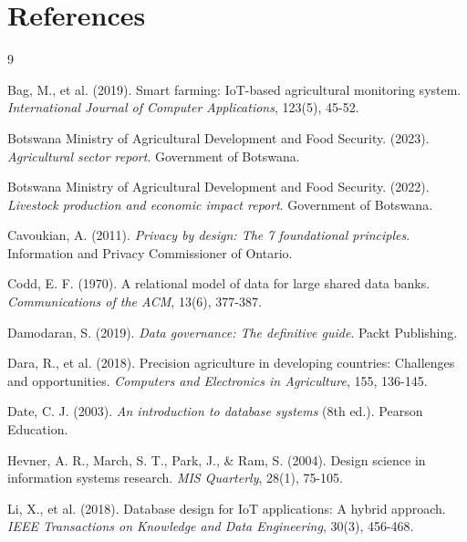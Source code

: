 
\chapter*{References}


\begin{thebibliography}{9}

Bag, M., et al. (2019).
Smart farming: IoT-based agricultural monitoring system.
\textit{International Journal of Computer Applications}, 123(5), 45-52.

Botswana Ministry of Agricultural Development and Food Security. (2023).
\textit{Agricultural sector report}.
Government of Botswana.

Botswana Ministry of Agricultural Development and Food Security. (2022).
\textit{Livestock production and economic impact report}.
Government of Botswana.

Cavoukian, A. (2011).
\textit{Privacy by design: The 7 foundational principles}.
Information and Privacy Commissioner of Ontario.

Codd, E. F. (1970).
A relational model of data for large shared data banks.
\textit{Communications of the ACM}, 13(6), 377-387.

Damodaran, S. (2019).
\textit{Data governance: The definitive guide}.
Packt Publishing.

Dara, R., et al. (2018).
Precision agriculture in developing countries: Challenges and opportunities.
\textit{Computers and Electronics in Agriculture}, 155, 136-145.

Date, C. J. (2003).
\textit{An introduction to database systems} (8th ed.).
Pearson Education.

Hevner, A. R., March, S. T., Park, J., \& Ram, S. (2004).
Design science in information systems research.
\textit{MIS Quarterly}, 28(1), 75-105.

Li, X., et al. (2018).
Database design for IoT applications: A hybrid approach.
\textit{IEEE Transactions on Knowledge and Data Engineering}, 30(3), 456-468.


\end{thebibliography}

